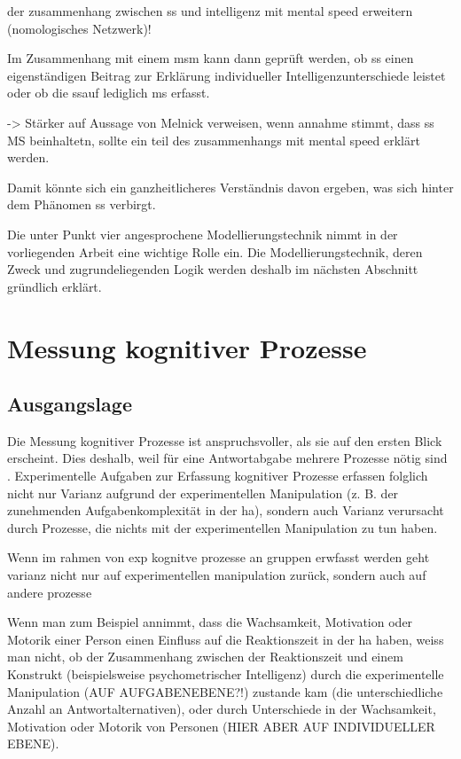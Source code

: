 \documentclass[11pt, twoside, a4paper]{book}		%
\begin{document}
der zusammenhang zwischen ss und intelligenz mit mental speed erweitern (nomologisches Netzwerk)!

Im Zusammenhang mit einem \gls{msm} kann dann geprüft werden, ob \gls{ss} einen eigenständigen Beitrag zur Erklärung individueller Intelligenzunterschiede leistet oder ob die \gls{ssauf} lediglich \gls{ms} erfasst. 

-> Stärker auf Aussage von Melnick verweisen, wenn annahme stimmt, dass ss MS beinhaltetn, sollte ein teil des zusammenhangs mit mental speed erklärt werden.

Damit könnte sich ein ganzheitlicheres Verständnis davon ergeben, was sich hinter dem Phänomen \gls{ss} verbirgt.

Die unter Punkt vier angesprochene Modellierungstechnik nimmt in der vorliegenden Arbeit eine wichtige Rolle ein. Die Modellierungstechnik, deren Zweck und zugrundeliegenden Logik werden deshalb im nächsten Abschnitt gründlich erklärt.


\section{Messung kognitiver Prozesse}

\subsection{Ausgangslage}

Die Messung kognitiver Prozesse ist anspruchsvoller, als sie auf den ersten Blick erscheint. Dies deshalb, weil für eine Antwortabgabe mehrere Prozesse nötig sind \citep[]{Jensen1982b, Miller2013, Neubauer1997a, Schweizer2007, Unsworth2007, vanZomeren1994}. Experimentelle Aufgaben zur Erfassung kognitiver Prozesse erfassen folglich nicht nur Varianz aufgrund der experimentellen Manipulation (z. B. der zunehmenden Aufgabenkomplexität in der \gls{ha}), sondern auch Varianz verursacht durch Prozesse, die nichts mit der experimentellen Manipulation zu tun haben. 

Wenn im rahmen von exp kognitve prozesse an gruppen erwfasst werden geht varianz nicht nur auf experimentellen manipulation zurück, sondern auch auf andere prozesse


Wenn man zum Beispiel annimmt, dass die Wachsamkeit, Motivation oder Motorik einer Person einen Einfluss auf die Reaktionszeit in der \gls{ha} haben, weiss man nicht, ob der Zusammenhang zwischen der Reaktionszeit und einem Konstrukt (beispielsweise psychometrischer Intelligenz) durch die experimentelle Manipulation (AUF AUFGABENEBENE?!) zustande kam (die unterschiedliche Anzahl an Antwortalternativen), oder durch Unterschiede in der Wachsamkeit, Motivation oder Motorik von Personen (HIER ABER AUF INDIVIDUELLER EBENE). 
\end{document}
